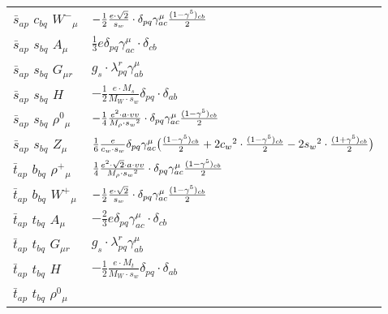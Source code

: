 \begin{center}
\begin{tabular}{|l|l|}
$\bar{s}{}_{a p }$ \phantom{-} $c{}_{b q }$ \phantom{-} $W^-{}_{\mu }$ \phantom{-}  &
	$-\frac{1}{2}\frac{ e \cdot\sqrt{2}}{ s_w}\cdot \delta_{p q} \gamma_{a c}^\mu {(1-\gamma^5)_{c b}\over 2} $\\[2mm]
$\bar{s}{}_{a p }$ \phantom{-} $s{}_{b q }$ \phantom{-} ${A}_{\mu }$ \phantom{-}  &
	$\frac{1}{3} e\delta_{p q} \gamma_{a c}^\mu \cdot \delta_{c b} $\\[2mm]
$\bar{s}{}_{a p }$ \phantom{-} $s{}_{b q }$ \phantom{-} ${G}_{\mu r }$ \phantom{-}  &
	$ g_s\cdot \lambda_{p q}^r \gamma_{a b}^\mu $\\[2mm]
$\bar{s}{}_{a p }$ \phantom{-} $s{}_{b q }$ \phantom{-} ${H}_{}$ \phantom{-}  &
	$-\frac{1}{2}\frac{ e \cdot M_s}{ M_W \cdot s_w}\delta_{p q} \cdot \delta_{a b} $\\[2mm]
$\bar{s}{}_{a p }$ \phantom{-} $s{}_{b q }$ \phantom{-} $\rho^0{}_{\mu }$ \phantom{-}  &
	$-\frac{1}{4}\frac{ e{}^2  \cdot a \cdot vv}{ M_{\rho} \cdot s_w{}^2 }\cdot \delta_{p q} \gamma_{a c}^\mu {(1-\gamma^5)_{c b}\over 2} $\\[2mm]
$\bar{s}{}_{a p }$ \phantom{-} $s{}_{b q }$ \phantom{-} ${Z}_{\mu }$ \phantom{-}  &
	$\frac{1}{6}\frac{ e}{ c_w \cdot s_w}\delta_{p q} \gamma_{a c}^\mu \big({(1-\gamma^5)_{c b}\over 2} +2 c_w{}^2 \cdot {(1-\gamma^5)_{c b}\over 2} -2 s_w{}^2 \cdot {(1+\gamma^5)_{c b}\over 2} \big)$\\[2mm]
$\bar{t}{}_{a p }$ \phantom{-} $b{}_{b q }$ \phantom{-} $\rho^+{}_{\mu }$ \phantom{-}  &
	$\frac{1}{4}\frac{ e{}^2  \cdot\sqrt{2} \cdot a \cdot vv}{ M_{\rho} \cdot s_w{}^2 }\cdot \delta_{p q} \gamma_{a c}^\mu {(1-\gamma^5)_{c b}\over 2} $\\[2mm]
$\bar{t}{}_{a p }$ \phantom{-} $b{}_{b q }$ \phantom{-} $W^+{}_{\mu }$ \phantom{-}  &
	$-\frac{1}{2}\frac{ e \cdot\sqrt{2}}{ s_w}\cdot \delta_{p q} \gamma_{a c}^\mu {(1-\gamma^5)_{c b}\over 2} $\\[2mm]
$\bar{t}{}_{a p }$ \phantom{-} $t{}_{b q }$ \phantom{-} ${A}_{\mu }$ \phantom{-}  &
	$-\frac{2}{3} e\delta_{p q} \gamma_{a c}^\mu \cdot \delta_{c b} $\\[2mm]
$\bar{t}{}_{a p }$ \phantom{-} $t{}_{b q }$ \phantom{-} ${G}_{\mu r }$ \phantom{-}  &
	$ g_s\cdot \lambda_{p q}^r \gamma_{a b}^\mu $\\[2mm]
$\bar{t}{}_{a p }$ \phantom{-} $t{}_{b q }$ \phantom{-} ${H}_{}$ \phantom{-}  &
	$-\frac{1}{2}\frac{ e \cdot M_t}{ M_W \cdot s_w}\delta_{p q} \cdot \delta_{a b} $\\[2mm]
$\bar{t}{}_{a p }$ \phantom{-} $t{}_{b q }$ \phantom{-} $\rho^0{}_{\mu }$ \phantom{-}  &

\end{tabular}
\end{center}
